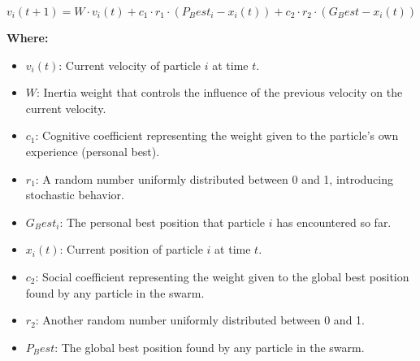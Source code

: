 
\begin{equation}
v_i(t+1) = W \cdot v_i(t) + c_1 \cdot r_1 \cdot (P_Best_i - x_i(t)) + c_2 \cdot r_2 \cdot (G_Best - x_i(t))
\end{equation}

\textbf{Where:}
\begin{itemize}
    \item \( v_i(t) \): Current velocity of particle \( i \) at time \( t \).
    \item \( W \): Inertia weight that controls the influence of the previous velocity on the current velocity.
    \item \( c_1 \): Cognitive coefficient representing the weight given to the particle's own experience (personal best).
    \item \( r_1 \): A random number uniformly distributed between 0 and 1, introducing stochastic behavior.
    \item \( G_ Best_i \): The personal best position that particle \( i \) has encountered so far.
    \item \( x_i(t) \): Current position of particle \( i \) at time \( t \).
    \item \( c_2 \): Social coefficient representing the weight given to the global best position found by any particle in the swarm.
    \item \( r_2 \): Another random number uniformly distributed between 0 and 1.
    \item \( P_Best \): The global best position found by any particle in the swarm.
\end{itemize}


